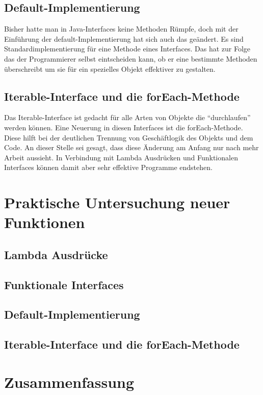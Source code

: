 \section{Default-Implementierung}
\label{sec:DI}
Bisher hatte man in Java-Interfaces keine Methoden Rümpfe, doch mit der
Einführung der default-Implementierung hat sich auch das geändert. Es sind
Standardimplementierung für eine Methode eines Interfaces. Das hat zur Folge das
der Programmierer selbst eintscheiden kann, ob er eine bestimmte Methoden
überschreibt um sie für ein spezielles Objekt effektiver zu gestalten.

\section{Iterable-Interface und die forEach-Methode}
\label{sec:IIufEM}
Das Iterable-Interface ist gedacht für alle Arten von Objekte die
"`durchlaufen"' werden können. Eine Neuerung in diesen Interfaces ist die
forEach-Methode. Diese hilft bei der deutlichen Trennung von Geschäftlogik des
Objekts und dem Code. An dieser Stelle sei gesagt, dass diese Änderung am Anfang
nur nach mehr Arbeit aussieht. In Verbindung mit Lambda Ausdrücken und
Funktionalen Interfaces können damit aber sehr effektive Programme endstehen. 


\chapter{Praktische Untersuchung neuer Funktionen}
\label{sec:Praxis}

\section{Lambda Ausdrücke}
\label{sec:Lambda}

\section{Funktionale Interfaces}
\label{sec:FI}

\section{Default-Implementierung}
\label{sec:DI}

\section{Iterable-Interface und die forEach-Methode}
\label{sec:IIufEM}

\chapter{Zusammenfassung}
\label{sec:Fazit}